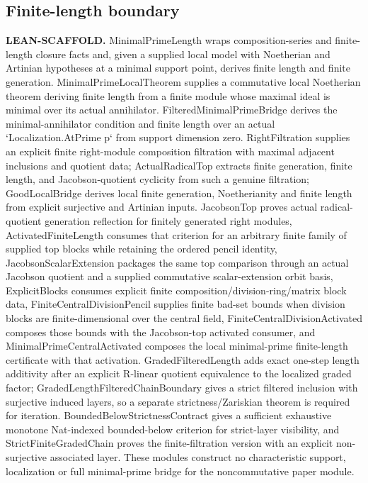 \subsection{Finite-length boundary}\hypertarget{claim:length-scaffold}{}\backmap
\textbf{LEAN-SCAFFOLD.} MinimalPrimeLength wraps composition-series and finite-length closure facts and, given a supplied local model with Noetherian and Artinian hypotheses at a minimal support point, derives finite length and finite generation. MinimalPrimeLocalTheorem supplies a commutative local Noetherian theorem deriving finite length from a finite module whose maximal ideal is minimal over its actual annihilator. FilteredMinimalPrimeBridge derives the minimal-annihilator condition and finite length over an actual `Localization.AtPrime p` from support dimension zero. RightFiltration supplies an explicit finite right-module composition filtration with maximal adjacent inclusions and quotient data; ActualRadicalTop extracts finite generation, finite length, and Jacobson-quotient cyclicity from such a genuine filtration; GoodLocalBridge derives local finite generation, Noetherianity and finite length from explicit surjective and Artinian inputs. JacobsonTop proves actual radical-quotient generation reflection for finitely generated right modules, ActivatedFiniteLength consumes that criterion for an arbitrary finite family of supplied top blocks while retaining the ordered pencil identity, JacobsonScalarExtension packages the same top comparison through an actual Jacobson quotient and a supplied commutative scalar-extension orbit basis, ExplicitBlocks consumes explicit finite composition/division-ring/matrix block data, FiniteCentralDivisionPencil supplies finite bad-set bounds when division blocks are finite-dimensional over the central field, FiniteCentralDivisionActivated composes those bounds with the Jacobson-top activated consumer, and MinimalPrimeCentralActivated composes the local minimal-prime finite-length certificate with that activation. GradedFilteredLength adds exact one-step length additivity after an explicit R-linear quotient equivalence to the localized graded factor; GradedLengthFilteredChainBoundary gives a strict filtered inclusion with surjective induced layers, so a separate strictness/Zariskian theorem is required for iteration. BoundedBelowStrictnessContract gives a sufficient exhaustive monotone Nat-indexed bounded-below criterion for strict-layer visibility, and StrictFiniteGradedChain proves the finite-filtration version with an explicit non-surjective associated layer. These modules construct no characteristic support, localization or full minimal-prime bridge for the noncommutative paper module.

